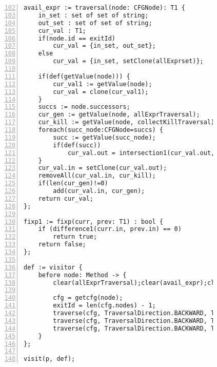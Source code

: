 \begin{figure}[ht!]
\begin{lstlisting}[numbers=left, tabsize=4, escapechar=@, caption={Very busy expression},label={lst:vbe-code},firstline=102, firstnumber=102]
avail_expr := traversal(node: CFGNode): T1 {
	in_set : set of set of string;
	out_set : set of set of string;
	cur_val : T1;
	if(node.id == exitId)
		cur_val = {in_set, out_set};
	else
		cur_val = {in_set, setClone(allExprset)};

	if(def(getValue(node))) {
		cur_val1 := getValue(node);
		cur_val = clone(cur_val1);
	}
	succs := node.successors;
	cur_gen := getValue(node, allExprTraversal);
	cur_kill := getValue(node, collectKillTraversal);
	foreach(succ_node:CFGNode=succs) {
		succ := getValue(succ_node);
		if(def(succ))
			cur_val.out = intersection1(cur_val.out, succ.in);
	}
	cur_val.in = setClone(cur_val.out);
	removeAll(cur_val.in, cur_kill);
	if(len(cur_gen)!=0)
		add(cur_val.in, cur_gen);
	return cur_val;
};

fixp1 := fixp(curr, prev: T1) : bool {
	if (difference1(curr.in, prev.in) == 0)
		return true;	
	return false;
};

def := visitor {
	before node: Method -> {
		clear(allExprTraversal);clear(avail_expr);clear(collectKillTraversal);clear(allExprset);

		cfg = getcfg(node);
		exitId = len(cfg.nodes) - 1;
		traverse(cfg, TraversalDirection.BACKWARD, TraversalKind.HYBRID, allExprTraversal);
		traverse(cfg, TraversalDirection.BACKWARD, TraversalKind.HYBRID, collectKillTraversal);
		traverse(cfg, TraversalDirection.BACKWARD, TraversalKind.HYBRID, avail_expr, fixp1);
	}
};

visit(p, def);
\end{lstlisting}
\end{figure}